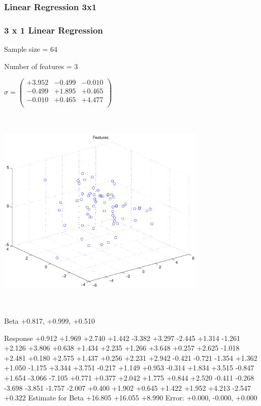 \documentclass[9pt]{article}
\theoremstyle{plain}
\theoremstyle{definition}
\theoremstyle{remark}
\numberwithin{equation}{section}
\begin{document}
\subsubsection{Linear Regression 3x1}
\subsubsection{3 x 1 Linear Regression}
Sample size = 64

Number of features = 3

$\sigma = \left(
\begin{array}{
ccc}
+3.952 & -0.499 & -0.010 \\
-0.499 & +1.895 & +0.465 \\
-0.010 & +0.465 & +4.477 \\
\end{array}
\right)$ \newline 

\includegraphics[width=10.0cm,height=10.0cm]{regression_features.pdf}

Beta
+0.817, +0.999, +0.510

Response
+0.912
+1.969
+2.740
+1.442
-3.382
+3.297
-2.445
+1.314
-1.261
+2.126
+3.806
+0.638
+1.434
+2.235
+1.266
+3.648
+0.257
+2.625
-1.018
+2.481
+0.180
+2.575
+1.437
+0.256
+2.231
+2.942
-0.421
-0.721
-1.354
+1.362
+1.050
-1.175
+3.344
+3.751
-0.217
+1.149
+0.953
-0.314
+1.834
+3.515
-0.847
+1.654
-3.066
-7.105
+0.771
+0.377
+2.042
+1.775
+0.844
+2.520
-0.411
-0.268
-3.698
-3.851
-1.757
-2.007
+0.400
+1.902
+0.645
+1.422
+1.952
+4.213
-2.547
+0.322
Estimate for Beta
+16.805
+16.055
+8.990
Error:
+0.000, -0.000, +0.000
\end{document}
